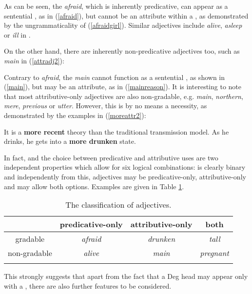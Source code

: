 As can be seen, the  \textit{afraid}, which is inherently predicative, can appear as a sentential , as in (\ref{afraid}), but cannot be an attribute within a , as demonstrated by the ungrammaticality of (\ref{afraidgirl}). Similar adjectives include \textit{alive}, \textit{asleep} or \textit{ill} in .

On the other hand, there are inherently non-predicative adjectives too, such as \textit{main} in (\ref{attradj2}):

\ea \label{attradj2}
 \label{main}
 \label{mainreason}
\z
\z

Contrary to \textit{afraid}, the  \textit{main} cannot function as a sentential , as shown in (\ref{main}), but may be an attribute, as in (\ref{mainreason}). It is interesting to note that most attributive-only adjectives are also non-gradable, e.g. \textit{main}, \textit{northern}, \textit{mere}, \textit{previous} or \textit{utter}. However, this is by no means a necessity, as demonstrated by the examples in (\ref{moreattr2}):

\ea \label{moreattr2}
\ea	It is a \textbf{more recent} theory than the traditional transmission model.
\ex	As he drinks, he gets into a \textbf{more drunken} state.
\z
\z

In fact,  and the choice between predicative and attributive uses are two independent properties which allow for six logical combinations:  is clearly binary and independently from this, adjectives may be predicative-only, attributive-only and may allow both options. Examples are given in Table \ref{tableadjectives}.

\begin{table}
\begin{tabular}{cccc}
\lsptoprule
{} & predicative-only & attributive-only & both\\
\midrule
gradable & \textit{afraid} & \textit{drunken} & \textit{tall} \\
non-gradable & \textit{alive} & \textit{main} & \textit{pregnant} \\
\lspbottomrule
\end{tabular}
\caption{The classification of adjectives.}
\label{tableadjectives}
\end{table}

This strongly suggests that apart from the fact that a Deg head may appear only with a , there are also further features to be considered.

